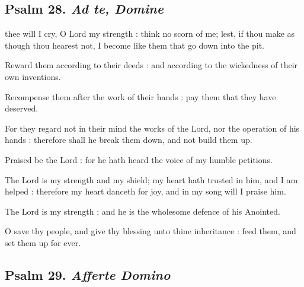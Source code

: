 \subsection{Psalm 28. \textit{Ad te, Domine}}

 thee will I cry, O Lord my strength : think no scorn of me; lest, if thou make as though thou hearest not, I become like them that go down into the pit.\par
{}
Reward them according to their deeds : and according to the wickedness of their own inventions.\par
{}Recompense them after the work of their hands : pay them that they have deserved.\par
{}For they regard not in their mind the works of the Lord, nor the operation of his hands : therefore shall he break them down, and not build them up.\par
{}Praised be the Lord : for he hath heard the voice of my humble petitions.\par
{}The Lord is my strength and my shield; my heart hath trusted in him, and I am helped : therefore my heart danceth for joy, and in my song will I praise him.\par
{}The Lord is my strength : and he is the wholesome defence of his Anointed.\par
{}O save thy people, and give thy blessing unto thine inheritance : feed them, and set them up for ever.\par

\subsection{Psalm 29. \textit{Afferte Domino}}

